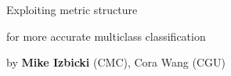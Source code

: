 \begin{frame}{}

\begin{center}
\LARGE
Exploiting metric structure
    
for more accurate multiclass classification
\end{center}
\begin{center}
    by \textbf{Mike Izbicki} (CMC), Cora Wang (CGU)
\end{center}

\vspace{0.05in}

    \begin{center}
    \end{center}

\end{frame}
